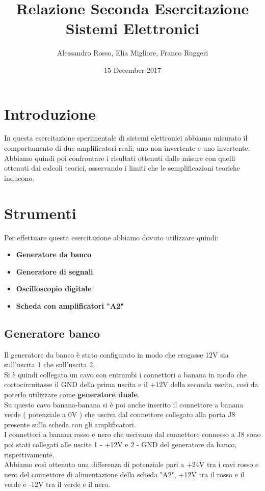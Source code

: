 \documentclass{article}
\author{Alessandro Rosso, Elia Migliore, Franco Ruggeri}
\title{Relazione Seconda Esercitazione Sistemi Elettronici}
\date{15 December 2017}
\begin{document}
\section{Introduzione}
In questa esercitazione sperimentale di sistemi elettronici abbiamo misurato il comportamento di due amplificatori reali, uno non invertente e uno invertente.\\Abbiamo quindi poi confrontare i risultati ottenuti dalle misure con quelli ottenuti dai calcoli teorici, osservando i limiti che le semplificazioni teoriche inducono.

\section{Strumenti}
Per effettuare questa esercitazione abbiamo dovuto utilizzare quindi:
\begin{itemize}
	\item \textbf{Generatore da banco}
	\item \textbf{Generatore di segnali}
    \item \textbf{Oscilloscopio digitale}
	\item \textbf{Scheda con amplificatori "A2"}
\end{itemize}

\subsection{Generatore banco}

Il generatore da banco è stato configurato in modo che erogasse 12V sia sull'uscita 1 che sull'uscita 2.
\\
Si è quindi collegato un cavo con entrambi i connettori a banana in modo che cortocircuitasse il GND della prima uscita e il +12V della seconda uscita, così da poterlo utilizzare come \textbf{generatore duale}.\\ Su questo cavo banana-banana si è poi anche inserito il connettore a banana verde ( potenziale a 0V ) che usciva dal connettore collegato alla porta J8 presente sulla scheda con gli amplificatori.\\
I connettori a banana rosso e nero che uscivano dal connettore connesso a J8 sono poi stati collegati alle uscite 1 - +12V e 2 - GND del generatore da banco, rispettivamente.\\
Abbiamo così ottenuto una differenza di potenziale pari a +24V tra i cavi rosso e nero del connettore di alimentazione della scheda "A2", +12V tra il rosso e il verde e -12V tra il verde e il nero.
\end{document}
